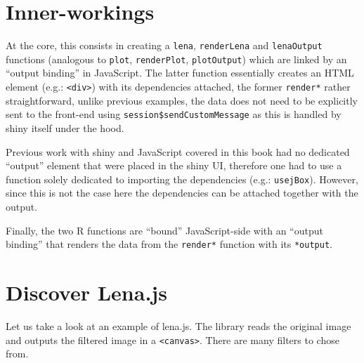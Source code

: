 \documentclass[
]{krantz}
\begin{document}
\hypertarget{inner-workings}{%
\section*{Inner-workings}\label{inner-workings}}


At the core, this consists in creating a \texttt{lena}, \texttt{renderLena} and \texttt{lenaOutput} functions (analogous to \texttt{plot}, \texttt{renderPlot}, \texttt{plotOutput}) which are linked by an ``output binding'' in JavaScript. The latter function essentially creates an HTML element (e.g.: \texttt{\textless{}div\textgreater{}}) with its dependencies attached, the former \texttt{render*} rather straightforward, unlike previous examples, the data does not need to be explicitly sent to the front-end using \texttt{session\$sendCustomMessage} as this is handled by shiny itself under the hood.

Previous work with shiny and JavaScript covered in this book had no dedicated ``output'' element that were placed in the shiny UI, therefore one had to use a function solely dedicated to importing the dependencies (e.g.: \texttt{usejBox}). However, since this is not the case here the dependencies can be attached together with the output.

Finally, the two R functions are ``bound'' JavaScript-side with an ``output binding'' that renders the data from the \texttt{render*} function with its \texttt{*output}.

\hypertarget{discover-lena.js}{%
\section*{Discover Lena.js}\label{discover-lena.js}}


Let us take a look at an example of lena.js. The library reads the original image and outputs the filtered image in a \texttt{\textless{}canvas\textgreater{}}. There are many filters to chose from.
\end{document}
